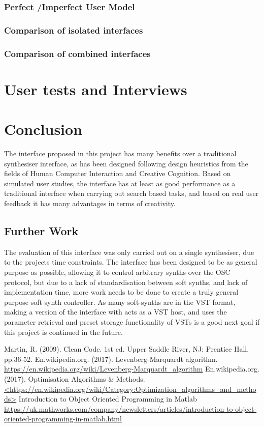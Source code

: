 \documentclass[11pt, oneside]{report}   	%
\begin{document}
\subsection{Perfect /Imperfect User Model}
\subsection{Comparison of isolated interfaces}
\subsection{Comparison of combined interfaces}

\chapter{User tests and Interviews}

\chapter{Conclusion}
The interface proposed in this project has many benefits over a traditional synthesiser interface, as has been designed following design heuristics from the fields of Human Computer Interaction and Creative Cognition. Based on simulated user studies, the interface has at least as good performance as a traditional interface when carrying out search based tasks, and based on real user feedback it has many advantages in terms of creativity.
\section{Further Work}
The evaluation of this interface was only carried out on a single synthesiser, due to the projects time constraints. The interface has been designed to be as general purpose as possible, allowing it to control arbitrary synths over the OSC protocol, but due to a lack of standardisation between soft synths, and lack of implementation time, more work needs to be done to create a truly general purpose soft synth controller. As many soft-synths are in the VST format, making a version of the interface with acts as a VST host, and uses the parameter retrieval and preset storage functionality of VSTs is a good next goal if this project is continued in the future.

\begin{thebibliography}{9}
\singlespacing
{}
Martin, R. (2009). Clean Code. 1st ed. Upper Saddle River, NJ: Prentice Hall, pp.36-52.
En.wikipedia.org. (2017). Levenberg-Marquardt algorithm. \\
\url{https://en.wikipedia.org/wiki/Levenberg-Marquardt_algorithm}
En.wikipedia.org. (2017). Optimisation Algorithms \& Methods.
\url{<https://en.wikipedia.org/wiki/Category:Optimization_algorithms_and_methods>}
Introduction to Object Oriented Programming in Matlab\\
\url{https://uk.mathworks.com/company/newsletters/articles/introduction-to-object-oriented-programming-in-matlab.html}
\end{thebibliography}
\end{document}
